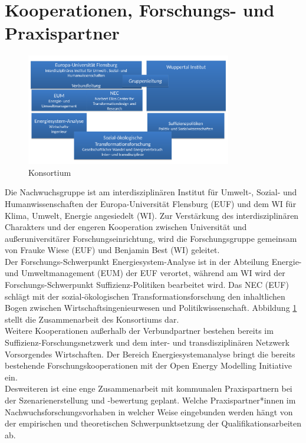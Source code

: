 \documentclass[a4paper,11pt,twoside]{scrartcl}
\begin{document}
\section{Kooperationen, Forschungs- und Praxispartner}
\label{sec:5}

\begin{figure}[!h]
    \centering
    \includegraphics[width=0.8\textwidth]{figures/Konsortium5.pdf}
    \caption{Konsortium}
    \label{fig:konsortium}
\end{figure}

Die Nachwuchsgruppe ist am interdisziplinären Institut für Umwelt-, Sozial- und Humanwissenschaften der Europa-Universität Flensburg (EUF) und dem WI für Klima, Umwelt, Energie angesiedelt (WI).
Zur Verstärkung des interdisziplinären Charakters und der engeren Kooperation zwischen Universität und außeruniversitärer Forschungseinrichtung, wird die Forschungsgruppe gemeinsam von Frauke Wiese (EUF) und Benjamin Best (WI) geleitet.\\
Der Forschungs-Schwerpunkt Energiesystem-Analyse ist in der Abteilung Energie- und Umweltmanagement (EUM) der EUF verortet, während am WI wird der Forschungs-Schwerpunkt Suffizienz-Politiken bearbeitet wird. Das NEC (EUF) schlägt mit der sozial-ökologischen Transformationsforschung den inhaltlichen Bogen zwischen Wirtschaftsingenieurwesen und Politikwissenschaft. Abbildung \ref{fig:konsortium} stellt die Zusammenarbeit des Konsortiums dar.\\
Weitere Kooperationen außerhalb der Verbundpartner bestehen bereits im Suffizienz-Forschungsnetzwerk und dem inter- und transdisziplinären Netzwerk Vorsorgendes Wirtschaften. Der Bereich Energiesystemanalyse bringt die bereits bestehende Forschungskooperationen mit der Open Energy Modelling Initiative \cite{openmod} ein.\\
Desweiteren ist eine enge Zusammenarbeit mit kommunalen Praxispartnern bei der Szenarienerstellung und -bewertung geplant. Welche Praxispartner*innen im Nachwuchsforschungsvorhaben in welcher Weise eingebunden werden hängt von der empirischen und theoretischen Schwerpunktsetzung der Qualifikationsarbeiten ab.
\end{document}
